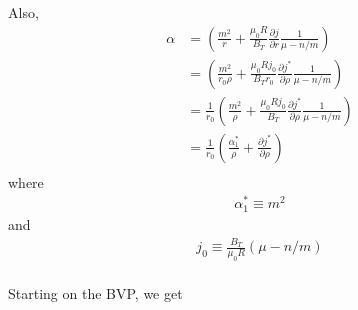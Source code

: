 \documentclass{article}
\begin{document}
Also,
\begin{equation} \label{}
\begin{split}
\alpha&=\left( \frac{m^2}{r} +\frac{\mu_0 R}{B_T} \frac{\partial j}{\partial r}\frac{1}{\mu-n/m} \right) \\
&=\left( \frac{m^2}{r_0 \rho} +\frac{\mu_0 R j_0}{B_T r_0} \frac{\partial j^*}{\partial \rho}\frac{1}{\mu-n/m} \right) \\
&=\frac{1}{r_0}\left( \frac{m^2}{ \rho} +\frac{\mu_0 R j_0}{B_T} \frac{\partial j^*}{\partial \rho}\frac{1}{\mu-n/m} \right) \\
&=\frac{1}{r_0}\left( \frac{\alpha^*_1}{ \rho} +\frac{\partial j^*}{\partial \rho} \right) \\%
\end{split} 
\end{equation} 
where
\begin{equation} \label{}
\begin{split}
\alpha_1^* \equiv m^2
\end{split} 
\end{equation} 
and
\begin{equation} \label{}
\begin{split}
j_0 \equiv  \frac{B_T}{\mu_0 R} \left( \mu-n/m \right) \\
\end{split} 
\end{equation} 

Starting on the BVP, we get
\end{document}
